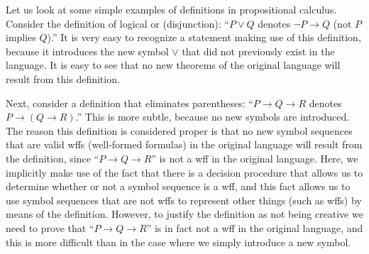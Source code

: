 Let us look at some simple examples of definitions in propositional
calculus.  Consider the definition of logical {\sc or}
(disjunction): ``$P\vee Q$ denotes $\neg P
\rightarrow Q$ (not $P$ implies $Q$).''  It is very easy to recognize a
statement making use of this definition, because it introduces the new
symbol $\vee$ that did not previously exist in the language.  It is easy
to see that no new theorems of the original language will result from
this definition.

Next, consider a definition that eliminates parentheses:  ``$P
\rightarrow Q\rightarrow R$ denotes $P\rightarrow (Q \rightarrow R)$.''
This is more subtle, because no new symbols are introduced.  The reason
this definition is considered proper is that no new symbol sequences
that are valid wffs (well-formed formulas) in the original language will result from the definition, since
``$P \rightarrow Q\rightarrow R$'' is not a wff in the original
language.  Here, we implicitly make use of the fact that there is a
decision procedure that allows us to determine whether or not a symbol
sequence is a wff, and this fact allows us to use symbol sequences that
are not wffs to represent other things (such as wffs) by means of the
definition.  However, to justify the definition as not being creative we
need to prove that ``$P \rightarrow Q\rightarrow R$'' is in fact not a
wff in the original language, and this is more difficult than in the
case where we simply introduce a new symbol.

